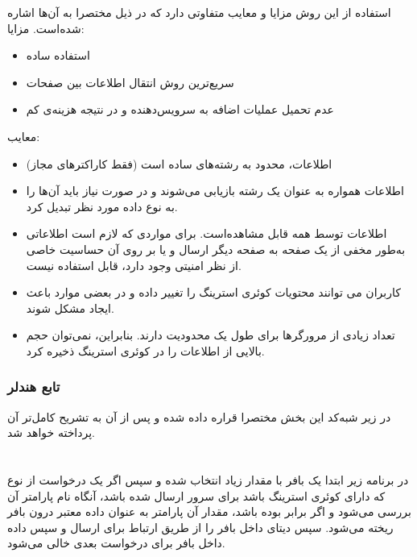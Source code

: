 استفاده از این روش مزایا و معایب متفاوتی دارد که در ذیل مختصرا به آن‌ها اشاره شده‌است.
\cite{QueryString}
مزایا:
\begin{itemize}
	
	\item
	استفاده ساده
	\item
	سریع‌ترین روش انتقال اطلاعات بين صفحات
	\item
	عدم تحميل عمليات اضافه به سرويس‌دهنده و در نتیجه هزینه‌ی کم
\end{itemize}

معایب:
\begin{itemize}
	
	\item
	اطلاعات، محدود به رشته‌های ساده است (فقط کاراکترهای مجاز)
	\item
	اطلاعات همواره به عنوان يک رشته بازيابی می‌شوند و در صورت نياز باید آن‌ها را به نوع داده مورد نظر تبديل كرد.
	\item
	اطلاعات توسط همه قابل مشاهده‌است. برای مواردی که لازم است اطلاعاتی به‌طور مخفی از يک صفحه به صفحه ديگر ارسال و يا بر روی آن حساسيت خاصی از نظر امنيتی وجود دارد، قابل استفاده نیست.
	\item
	كاربران می توانند محتويات کوئری استرینگ را تغيير داده و در بعضی موارد باعث ایجاد مشکل شوند.
	\item
	تعداد زيادی از مرورگرها برای طول یک
	محدودیت دارند. بنابراين، نمی‌توان حجم بالایی از اطلاعات را در کوئری استرینگ ذخيره كرد.
\end{itemize}

\subsubsection{تابع هندلر}
در زیر شبه‌کد این بخش مختصرا قراره داده شده و پس از آن به تشریح کامل‌تر آن پرداخته خواهد شد.
\section*{}
\begin{latin}
	
\end{latin}

در برنامه زیر ابتدا یک بافر
\noindent\unskip{}
با مقدار زیاد انتخاب شده و سپس اگر یک درخواست از نوع
که دارای کوئری استرینگ باشد برای سرور ارسال شده باشد، آنگاه نام پارامتر آن بررسی می‌شود و اگر برابر
بوده باشد، مقدار آن پارامتر به عنوان داده معتبر درون بافر ریخته می‌شود. سپس دیتای داخل بافر را از طریق ارتباط
برای
ارسال و سپس داده داخل بافر برای درخواست بعدی خالی می‌شود. 
